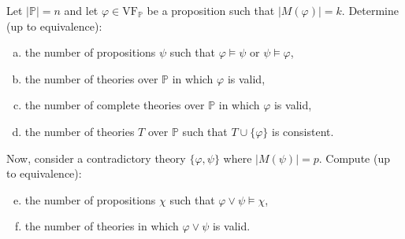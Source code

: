 \begin{problem}
    
    Let $|\mathbb{P}|=n$ and let $\varphi\in\mathrm{VF}_{\mathbb{P}}$ be a proposition such that $|M(\varphi)|=k$. Determine (up to equivalence):
    \begin{enumerate}[(a)]
        \item the number of propositions $\psi$ such that $\varphi \models \psi$ or $\psi \models \varphi$,
        \item the number of theories over $\mathbb{P}$ in which $\varphi$ is valid,
        \item the number of complete theories over $\mathbb{P}$ in which $\varphi$ is valid,
        \item the number of theories $T$ over $\mathbb{P}$ such that $T \cup \{\varphi\}$ is consistent.
    \end{enumerate}
    Now, consider a contradictory theory $\{\varphi,\psi\}$ where $|M(\psi)|=p$.  Compute (up to equivalence):
    \begin{enumerate}[(a)]\setcounter{enumi}{4}
        \item the number of propositions $\chi$ such that $\varphi \vee \psi \models \chi$, 
        \item the number of theories in which $\varphi \vee \psi$ is valid.
    \end{enumerate}


\end{problem}
